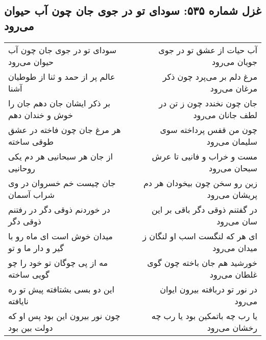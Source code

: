 \begin{center}
\section*{غزل شماره ۵۳۵: سودای تو در جوی جان چون آب حیوان می‌رود}
\label{sec:0535}
\begin{longtable}{l p{0.5cm} r}
سودای تو در جوی جان چون آب حیوان می‌رود
&&
آب حیات از عشق تو در جوی جویان می‌رود
\\
عالم پر از حمد و ثنا از طوطیان آشنا
&&
مرغ دلم بر می‌پرد چون ذکر مرغان می‌رود
\\
بر ذکر ایشان جان دهم جان را خوش و خندان دهم
&&
جان چون نخندد چون ز تن در لطف جانان می‌رود
\\
هر مرغ جان چون فاخته در عشق طوقی ساخته
&&
چون من قفس پرداخته سوی سلیمان می‌رود
\\
از جان هر سبحانیی هر دم یکی روحانیی
&&
مست و خراب و فانیی تا عرش سبحان می‌رود
\\
جان چیست خم خسروان در وی شراب آسمان
&&
زین رو سخن چون بیخودان هر دم پریشان می‌رود
\\
در خوردنم ذوقی دگر در رفتنم ذوقی دگر
&&
در گفتنم ذوقی دگر باقی بر این سان می‌رود
\\
میدان خوش است ای ماه رو با گیر و دار ما و تو
&&
ای هر که لنگست اسب او لنگان ز میدان می‌رود
\\
مه از پی چوگان تو خود را چو گویی ساخته
&&
خورشید هم جان باخته چون گوی غلطان می‌رود
\\
این دو بسی بشتافته پیش تو ره نایافته
&&
در نور تو دربافته بیرون ایوان می‌رود
\\
چون نور بیرون این بود پس او که دولت بین بود
&&
یا رب چه باتمکین بود یا رب چه رخشان می‌رود
\\
\end{longtable}
\end{center}
